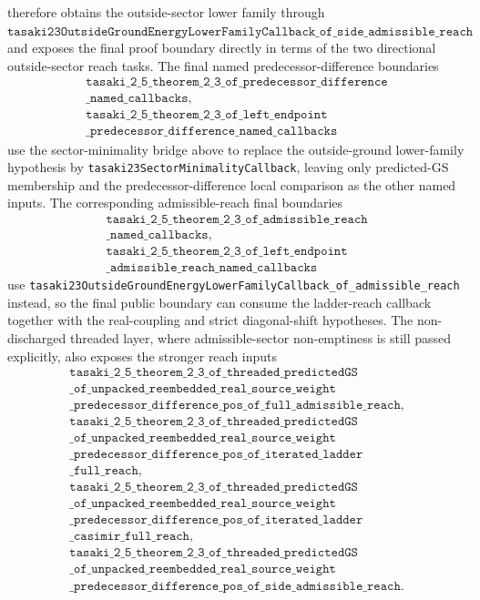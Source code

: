 \documentclass[a4paper,11pt]{article}
\begin{document}
therefore obtains the outside-sector lower family through
\(\texttt{tasaki23OutsideGroundEnergyLowerFamilyCallback\_of\_side\_admissible\_reach}\)
and exposes the final proof boundary directly in terms of the two directional
outside-sector reach tasks.  The final named predecessor-difference
boundaries
\[
\begin{gathered}
\texttt{tasaki\_2\_5\_theorem\_2\_3\_of\_predecessor\_difference}\\
\texttt{\_named\_callbacks},\\
\texttt{tasaki\_2\_5\_theorem\_2\_3\_of\_left\_endpoint}\\
\texttt{\_predecessor\_difference\_named\_callbacks}
\end{gathered}
\]
use the sector-minimality bridge above to replace the outside-ground
lower-family hypothesis by
\texttt{tasaki23SectorMinimalityCallback}, leaving only predicted-GS
membership and the predecessor-difference local comparison as the other
named inputs.  The corresponding admissible-reach final boundaries
\[
\begin{gathered}
\texttt{tasaki\_2\_5\_theorem\_2\_3\_of\_admissible\_reach}\\
\texttt{\_named\_callbacks},\\
\texttt{tasaki\_2\_5\_theorem\_2\_3\_of\_left\_endpoint}\\
\texttt{\_admissible\_reach\_named\_callbacks}
\end{gathered}
\]
use
\texttt{tasaki23OutsideGroundEnergyLowerFamilyCallback\_of\_admissible\_reach}
instead, so the final public boundary can consume the ladder-reach
callback together with the real-coupling and strict diagonal-shift
hypotheses.  The non-discharged threaded layer, where admissible-sector
non-emptiness is still passed explicitly, also exposes the stronger reach
inputs
\[
\begin{gathered}
\texttt{tasaki\_2\_5\_theorem\_2\_3\_of\_threaded\_predictedGS}\\
\texttt{\_of\_unpacked\_reembedded\_real\_source\_weight}\\
\texttt{\_predecessor\_difference\_pos\_of\_full\_admissible\_reach},\\
\texttt{tasaki\_2\_5\_theorem\_2\_3\_of\_threaded\_predictedGS}\\
\texttt{\_of\_unpacked\_reembedded\_real\_source\_weight}\\
\texttt{\_predecessor\_difference\_pos\_of\_iterated\_ladder}\\
\texttt{\_full\_reach},\\
\texttt{tasaki\_2\_5\_theorem\_2\_3\_of\_threaded\_predictedGS}\\
\texttt{\_of\_unpacked\_reembedded\_real\_source\_weight}\\
\texttt{\_predecessor\_difference\_pos\_of\_iterated\_ladder}\\
\texttt{\_casimir\_full\_reach},\\
\texttt{tasaki\_2\_5\_theorem\_2\_3\_of\_threaded\_predictedGS}\\
\texttt{\_of\_unpacked\_reembedded\_real\_source\_weight}\\
\texttt{\_predecessor\_difference\_pos\_of\_side\_admissible\_reach}.
\end{gathered}
\]
\end{document}
